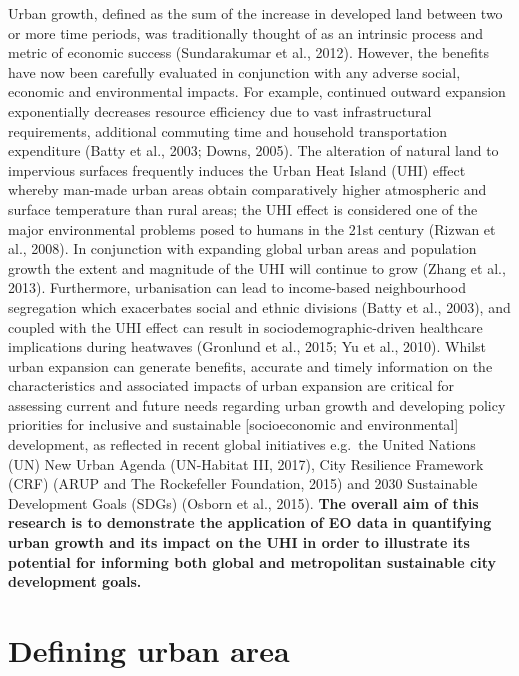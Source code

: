\documentclass[]{book}
\begin{document}
Urban growth, defined as the sum of the increase in developed land
between two or more time periods, was traditionally thought of as an
intrinsic process and metric of economic success (Sundarakumar et al.,
2012). However, the benefits have now been carefully evaluated in
conjunction with any adverse social, economic and environmental impacts.
For example, continued outward expansion exponentially decreases
resource efficiency due to vast infrastructural requirements, additional
commuting time and household transportation expenditure (Batty et al.,
2003; Downs, 2005). The alteration of natural land to impervious
surfaces frequently induces the Urban Heat Island (UHI) effect whereby
man-made urban areas obtain comparatively higher atmospheric and surface
temperature than rural areas; the UHI effect is considered one of the
major environmental problems posed to humans in the 21st century (Rizwan
et al., 2008). In conjunction with expanding global urban areas and
population growth the extent and magnitude of the UHI will continue to
grow (Zhang et al., 2013). Furthermore, urbanisation can lead to
income-based neighbourhood segregation which exacerbates social and
ethnic divisions (Batty et al., 2003), and coupled with the UHI effect
can result in sociodemographic-driven healthcare implications during
heatwaves (Gronlund et al., 2015; Yu et al., 2010). Whilst urban
expansion can generate benefits, accurate and timely information on the
characteristics and associated impacts of urban expansion are critical
for assessing current and future needs regarding urban growth and
developing policy priorities for inclusive and sustainable
{[}socioeconomic and environmental{]} development, as reflected in
recent global initiatives e.g.~the United Nations (UN) New Urban Agenda
(UN-Habitat III, 2017), City Resilience Framework (CRF) (ARUP and The
Rockefeller Foundation, 2015) and 2030 Sustainable Development Goals
(SDGs) (Osborn et al., 2015). \textbf{The overall aim of this research
is to demonstrate the application of EO data in quantifying urban growth
and its impact on the UHI in order to illustrate its potential for
informing both global and metropolitan sustainable city development
goals.}

\section{Defining urban area}\label{defining-urban-area}
\end{document}
